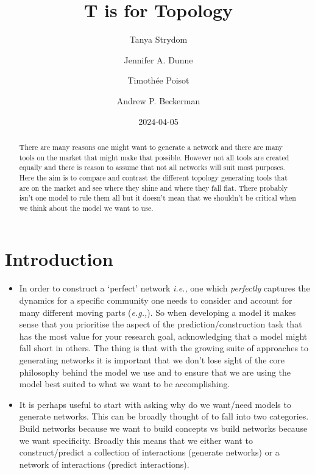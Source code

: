 \documentclass[
  letterpaper,
  DIV=11,
  numbers=noendperiod]{scrartcl}
\title{T is for Topology}
\author{Tanya Strydom \and Jennifer A. Dunne \and Timothée
Poisot \and Andrew P. Beckerman}
\date{2024-04-05}
\begin{document}
\maketitle
\begin{abstract}
There are many reasons one might want to generate a network and there
are many tools on the market that might make that possible. However not
all tools are created equally and there is reason to assume that not all
networks will suit most purposes. Here the aim is to compare and
contrast the different topology generating tools that are on the market
and see where they shine and where they fall flat. There probably isn't
one model to rule them all but it doesn't mean that we shouldn't be
critical when we think about the model we want to use.
\end{abstract}

\section{Introduction}\label{introduction}

\begin{itemize}
\item
  In order to construct a `perfect' network \emph{i.e.,} one which
  \emph{perfectly} captures the dynamics for a specific community one
  needs to consider and account for many different moving parts
  (\emph{e.g.,}). So when developing a model it makes sense that you
  prioritise the aspect of the prediction/construction task that has the
  most value for your research goal, acknowledging that a model might
  fall short in others. The thing is that with the growing suite of
  approaches to generating networks it is important that we don't lose
  sight of the core philosophy behind the model we use and to ensure
  that we are using the model best suited to what we want to be
  accomplishing.
\item
  It is perhaps useful to start with asking why do we want/need models
  to generate networks. This can be broadly thought of to fall into two
  categories. Build networks because we want to build concepts vs build
  networks because we want specificity. Broadly this means that we
  either want to construct/predict a collection of interactions
  (generate networks) or a network of interactions (predict
  interactions).
\end{itemize}
\end{document}
